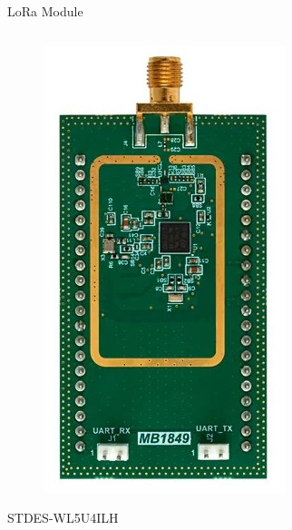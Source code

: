\documentclass{beamer}
\begin{document}
\begin{frame}{LoRa Module}
\begin{columns}[T]
\begin{column}{.3\textwidth}
    \centering
    \begin{figure}
        \includegraphics[width=.9\linewidth]{img/STDES-WL5U4ILH.jpg}
    \end{figure}
    STDES-WL5U4ILH
\end{column}
\hfil
\begin{column}{.3\textwidth}
    \centering
    \begin{figure}

\end{figure}
\end{column}
\end{columns}
\end{frame}
\end{document}
